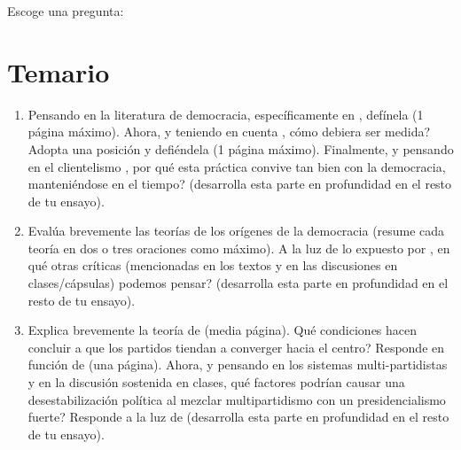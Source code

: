 \documentclass[onesided]{article}\usepackage[]{graphicx}\usepackage[]{color}
\begin{document}
Escoge una pregunta:

\section*{Temario}

\begin{enumerate}
	\item Pensando en la literatura de democracia, espec\'ificamente en \textcite{Lijphart2012,Schmitter1991,Collier1997}, def\'inela (1 p\'agina m\'aximo). Ahora, y teniendo en cuenta \textcite{Munck2002,Collier1999}, c\'omo debiera ser medida? Adopta una posici\'on y defi\'endela (1 p\'agina m\'aximo). Finalmente, y pensando en el clientelismo \parencite{Kitschelt2000,Auyero2000}, por qu\'e esta pr\'actica convive tan bien con la democracia, manteni\'endose en el tiempo? (desarrolla esta parte en profundidad en el resto de tu ensayo).
	\item Eval\'ua brevemente las teor\'ias de los or\'igenes de la democracia \parencite{Lipset1959,Przeworski1997,Moore:1966tn,Collier:1999rz,Boix:2003db,Acemoglu:1996rm} (resume cada teor\'ia en dos o tres oraciones como m\'aximo). A la luz de lo expuesto por \textcite{Haggard2012,Ansell:2014ty}, en qu\'e otras cr\'iticas (mencionadas en los textos y en las discusiones en clases/c\'apsulas) podemos pensar? (desarrolla esta parte en profundidad en el resto de tu ensayo).
	\item Explica brevemente la teor\'ia de \textcite{Downs:1957vg} (media p\'agina). Qu\'e condiciones hacen concluir a \textcite{Downs:1957vg} que los partidos tiendan a converger hacia el centro? Responde en funci\'on de \textcite{Boix:1999tj} (una p\'agina). Ahora, y pensando en los sistemas multi-partidistas y en la discusi\'on sostenida en clases, qu\'e factores podr\'ian causar una desestabilizaci\'on pol\'itica al mezclar multipartidismo con un presidencialismo fuerte? Responde a la luz de \textcite{Lijphart1990,Linz1985,Mainwaring1985} (desarrolla esta parte en profundidad en el resto de tu ensayo).
\end{enumerate}



\newpage
{}
\setcounter{page}{1}
\printbibliography
\end{document}
